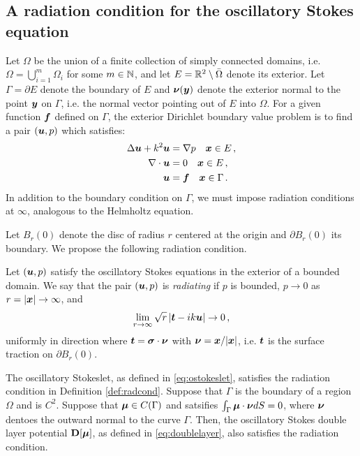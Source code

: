 \subsection{A radiation condition for the oscillatory Stokes
  equation}

Let $\Omega$ be the union of a finite collection of
simply connected domains, i.e. $\Omega = \bigcup_{i=1}^m \Omega_i$
for some $m \in \mathbb{N}$,
and let $E = \mathbb{R}^{2} \setminus \bar{\Omega}$ denote its
exterior.
%
Let $\Gamma = \partial E$ denote the boundary of $E$ and
${\boldsymbol \nu}({\boldsymbol y})$ denote the exterior normal to the point ${\boldsymbol y}$ on
$\Gamma$, i.e. the normal vector pointing out of $E$ into $\Omega$.
%
For a given function ${\boldsymbol f}$ defined on $\Gamma$,
the exterior Dirichlet boundary value problem is to
find a pair $({\boldsymbol u},p)$ which satisfies:
\begin{equation}
\begin{aligned}
\Delta {\boldsymbol u} + k^{2} {\boldsymbol u} &= \nabla p \quad {\boldsymbol x} \in E \, ,\\
\nabla \cdot {\boldsymbol u} &= 0 \quad {\boldsymbol x} \in E \, ,  \\
{\boldsymbol u} &= {\boldsymbol f} \quad {\boldsymbol x} \in \Gamma \, . \nonumber
\end{aligned}
\end{equation}
In addition to the boundary condition on
$\Gamma$, we must impose radiation conditions
at $\infty$, analogous to the Helmholtz equation.
%

Let $B_r(0)$ denote the disc of radius $r$ centered
at the origin and $\partial B_r(0)$ its boundary.
%
We propose the following radiation condition.

\begin{definition} \label{def:radcond}
Let $({\boldsymbol u},p)$ satisfy the oscillatory Stokes equations in
the exterior of a bounded domain. We say that
the pair $({\boldsymbol u},p)$ is {\em radiating} if
$p$ is bounded, $p \to 0$ as $r = |{\boldsymbol x}| \to \infty$, and 
\begin{equation}
\lim_{r\to \infty} \sqrt{r} \left| {\boldsymbol t} - i k {\boldsymbol u} \right| \to 0 \, ,
\label{eq:radcond}
\end{equation}
uniformly in direction where ${\boldsymbol t} = {\boldsymbol \sigma} \cdot {\boldsymbol \nu}$
with ${\boldsymbol \nu} = {\boldsymbol x}/|{\boldsymbol x}|$, i.e. ${\boldsymbol t}$ is the surface
traction on $\partial B_r(0)$.     
\end{definition}

\begin{thrm}
The oscillatory Stokeslet, as defined in \eqref{eq:ostokeslet}, 
satisfies the radiation condition in Definition \ref{def:radcond}.
Suppose that $\Gamma$ is the boundary of a region $\Omega$
and is $C^{2}$. 
Suppose that ${\boldsymbol \mu} \in C(\Gamma)$ and satsifies
$\int_{\Gamma} {\boldsymbol \mu} \cdot {\boldsymbol \nu} dS = 0$, where
${\boldsymbol \nu}$ dentoes the outward normal to the curve $\Gamma$.
Then, the oscillatory Stokes 
double layer potential ${\bf D}[{\boldsymbol \mu}]$, as defined in \eqref{eq:doublelayer},
also satisfies the radiation condition.
\end{thrm}

